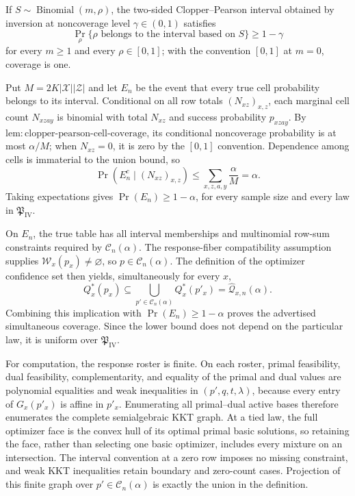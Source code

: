 If \(S\sim\operatorname{Binomial}(m,\rho)\), the two-sided Clopper--Pearson interval obtained by inversion at noncoverage level \(\gamma\in(0,1)\) satisfies
\[
 \Pr_\rho\{\rho\text{ belongs to the interval based on }S\}\geq1-\gamma
\]
for every \(m\geq1\) and every \(\rho\in[0,1]\); with the convention \([0,1]\) at \(m=0\), coverage is one.

Put \(M=2K|\mathcal X||\mathcal Z|\) and let \(E_n\) be the event that every true cell probability belongs to its interval.  Conditional on all row totals \((N_{xz})_{x,z}\), each marginal cell count \(N_{xzay}\) is binomial with total \(N_{xz}\) and success probability \(p_{xzay}\).  By \(\mathrm{lem{:}clopper\text{-}pearson\text{-}cell\text{-}coverage}\), its conditional noncoverage probability is at most \(\alpha/M\); when \(N_{xz}=0\), it is zero by the \([0,1]\) convention.  Dependence among cells is immaterial to the union bound, so
\[
 \Pr(E_n^c\mid(N_{xz})_{x,z})
 \leq\sum_{x,z,a,y}\frac{\alpha}{M}=\alpha.
\]
Taking expectations gives \(\Pr(E_n)\geq1-\alpha\), for every sample size and every law in \(\mathfrak P_{\mathrm{IV}}\).

On \(E_n\), the true table has all interval memberships and multinomial row-sum constraints required by \(\mathcal C_n(\alpha)\).  The response-fiber compatibility assumption supplies \(\mathcal W_x(p_x)\neq\varnothing\), so \(p\in\mathcal C_n(\alpha)\).  The definition of the optimizer confidence set then yields, simultaneously for every \(x\),
\[
 Q_x^*(p_x)\subseteq\bigcup_{p'\in\mathcal C_n(\alpha)}Q_x^*(p'_x)
 =\widehat{\mathcal Q}_{x,n}(\alpha).
\]
Combining this implication with \(\Pr(E_n)\geq1-\alpha\) proves the advertised simultaneous coverage.  Since the lower bound does not depend on the particular law, it is uniform over \(\mathfrak P_{\mathrm{IV}}\).

For computation, the response roster is finite.  On each roster, primal feasibility, dual feasibility, complementarity, and equality of the primal and dual values are polynomial equalities and weak inequalities in \((p',q,t,\lambda)\), because every entry of \(G_x(p'_x)\) is affine in \(p'_x\).  Enumerating all primal--dual active bases therefore enumerates the complete semialgebraic KKT graph.  At a tied law, the full optimizer face is the convex hull of its optimal primal basic solutions, so retaining the face, rather than selecting one basic optimizer, includes every mixture on an intersection.  The interval convention at a zero row imposes no missing constraint, and weak KKT inequalities retain boundary and zero-count cases.  Projection of this finite graph over \(p'\in\mathcal C_n(\alpha)\) is exactly the union in the definition.

